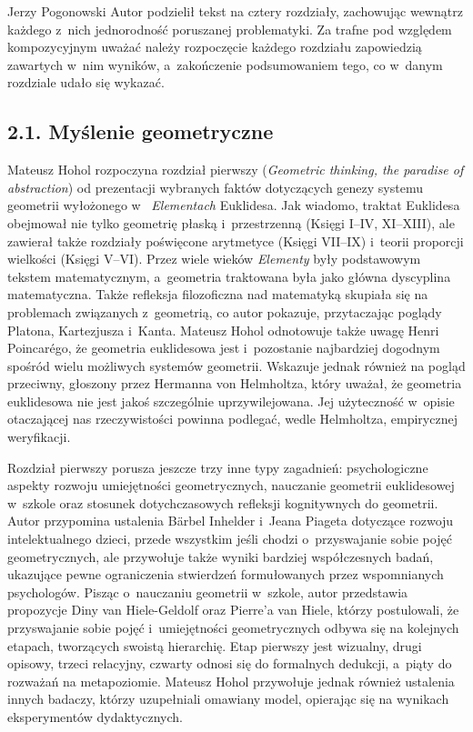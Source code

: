 \begin{newrevplenv}{Jerzy Pogonowski}
Autor podzielił tekst na cztery rozdziały, zachowując wewnątrz
każdego z~nich jednorodność poruszanej problematyki. Za trafne pod
względem kompozycyjnym uważać należy rozpoczęcie każdego rozdziału
zapowiedzią zawartych w~nim wyników, a~zakończenie podsumowaniem
tego, co w~danym rozdziale udało się wykazać.

\subsection{2.1. Myślenie geometryczne}

Mateusz Hohol rozpoczyna rozdział pierwszy ({\em Geometric
thinking, the paradise of abstraction}) od prezentacji wybranych
faktów dotyczących genezy systemu geometrii wyłożonego w~{\em
Elementach} Euklidesa. Jak wiadomo, traktat Euklidesa obejmował
nie tylko geometrię płaską i~przestrzenną (Księgi I--IV,
XI--XIII), ale zawierał także rozdziały poświęcone arytmetyce
(Księgi VII--IX) i~teorii proporcji wielkości (Księgi V--VI).
Przez wiele wieków {\em Elementy} były podstawowym tekstem
matematycznym, a~geometria traktowana była jako główna dyscyplina
matematyczna. Także refleksja filozoficzna nad matematyką skupiała
się na problemach związanych z~geometrią, co autor pokazuje,
przytaczając poglądy Platona, Kartezjusza i~Kanta. Mateusz Hohol
odnotowuje także uwagę Henri Poincar\'{e}go, że geometria
euklidesowa jest i~pozostanie najbardziej dogodnym spośród wielu
możliwych systemów geometrii. Wskazuje jednak również na pogląd
przeciwny, głoszony przez Hermanna von Helmholtza, który uważał,
że geometria euklidesowa nie jest jakoś szczególnie
uprzywilejowana. Jej użyteczność w~opisie otaczającej nas
rzeczywistości powinna podlegać, wedle Helmholtza, empirycznej
weryfikacji.

Rozdział pierwszy porusza jeszcze trzy inne typy zagadnień:
psychologiczne aspekty rozwoju umiejętności geometrycznych,
nauczanie geometrii euklidesowej w~szkole oraz stosunek
dotychczasowych refleksji kognitywnych do geometrii. Autor
przypomina ustalenia B\"{a}rbel Inhelder i~Jeana Piageta dotyczące
rozwoju intelektualnego dzieci, przede wszystkim jeśli chodzi o~przyswajanie sobie pojęć geometrycznych, ale przywołuje także
wyniki bardziej współczesnych badań, ukazujące pewne ograniczenia
stwierdzeń formułowanych przez wspomnianych psychologów. Pisząc o~nauczaniu geometrii w~szkole, autor przedstawia propozycje Diny
van Hiele-Geldolf oraz Pierre'a van Hiele, którzy postulowali, że
przyswajanie sobie pojęć i~umiejętności geometrycznych odbywa się
na kolejnych etapach, tworzących swoistą hierarchię. Etap pierwszy
jest wizualny, drugi opisowy, trzeci relacyjny, czwarty odnosi się
do formalnych dedukcji, a~piąty do rozważań na metapoziomie.
Mateusz Hohol przywołuje jednak również ustalenia innych badaczy,
którzy uzupełniali omawiany model, opierając się na wynikach
eksperymentów dydaktycznych.


\end{newrevplenv}
